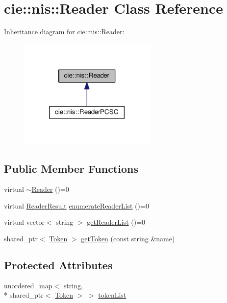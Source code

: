 \hypertarget{classcie_1_1nis_1_1Reader}{\section{cie\-:\-:nis\-:\-:Reader Class Reference}
\label{classcie_1_1nis_1_1Reader}
}


Inheritance diagram for cie\-:\-:nis\-:\-:Reader\-:
\nopagebreak
\begin{figure}[H]
\begin{center}
\leavevmode
\includegraphics[width=194pt]{classcie_1_1nis_1_1Reader__inherit__graph}
\end{center}
\end{figure}
\subsection*{Public Member Functions}
\begin{DoxyCompactItemize}
\item 
virtual \hyperlink{classcie_1_1nis_1_1Reader_aaca585569e44593b0f56818604336016}{$\sim$\-Reader} ()=0
\item 
virtual \hyperlink{nis__types_8h_a484156f5b8cf43396c5bbe77226fa8da}{Reader\-Result} \hyperlink{classcie_1_1nis_1_1Reader_adcb144784f8ea7c24af4a3f60b47b73d}{enumerate\-Reader\-List} ()=0
\item 
virtual vector$<$ string $>$ \hyperlink{classcie_1_1nis_1_1Reader_adaa0e8d0e2b367c0af8053fde8ae0af8}{get\-Reader\-List} ()=0
\item 
shared\-\_\-ptr$<$ \hyperlink{classcie_1_1nis_1_1Token}{Token} $>$ \hyperlink{classcie_1_1nis_1_1Reader_a40efb63e999b4a53b56a9f3999e884bb}{get\-Token} (const string \&name)
\end{DoxyCompactItemize}
\subsection*{Protected Attributes}
\begin{DoxyCompactItemize}
\item 
unordered\-\_\-map$<$ string, \\*
shared\-\_\-ptr$<$ \hyperlink{classcie_1_1nis_1_1Token}{Token} $>$ $>$ \hyperlink{classcie_1_1nis_1_1Reader_ad94db6ba461e4f00d53488c4863cda20}{token\-List}
\end{DoxyCompactItemize}


